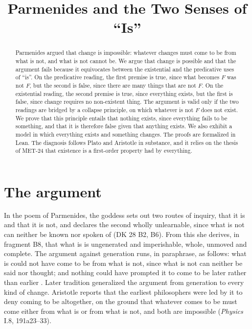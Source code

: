 \documentclass{situationist-preprint}
\title{Parmenides and the Two Senses of \enquote{Is}}
\begin{document}
\maketitle

\begin{abstract}
Parmenides argued that change is impossible: whatever changes must come to be from what is not, and what is not cannot be. We argue that change is possible and that the argument fails because it equivocates between the existential and the predicative uses of \enquote{is}. On the predicative reading, the first premise is true, since what becomes $F$ was not $F$, but the second is false, since there are many things that are not $F$. On the existential reading, the second premise is true, since everything exists, but the first is false, since change requires no non-existent thing. The argument is valid only if the two readings are bridged by a collapse principle, on which whatever is not $F$ does not exist. We prove that this principle entails that nothing exists, since everything fails to be something, and that it is therefore false given that anything exists. We also exhibit a model in which everything exists and something changes. The proofs are formalized in Lean. The diagnosis follows Plato and Aristotle in substance, and it relies on the thesis of MET-24 that existence is a first-order property had by everything.
\end{abstract}

\section{The argument}

In the poem of Parmenides, the goddess sets out two routes of inquiry, that it is and that it is not, and declares the second wholly unlearnable, since what is not can neither be known nor spoken of (DK 28 B2, B6). From this she derives, in fragment B8, that what is is ungenerated and imperishable, whole, unmoved and complete. The argument against generation runs, in paraphrase, as follows: what is could not have come to be from what is not, since what is not can neither be said nor thought; and nothing could have prompted it to come to be later rather than earlier \citep{Barnes1979}. Later tradition generalized the argument from generation to every kind of change. Aristotle reports that the earliest philosophers were led by it to deny coming to be altogether, on the ground that whatever comes to be must come either from what is or from what is not, and both are impossible (\emph{Physics} I.8, 191a23--33).
\end{document}
